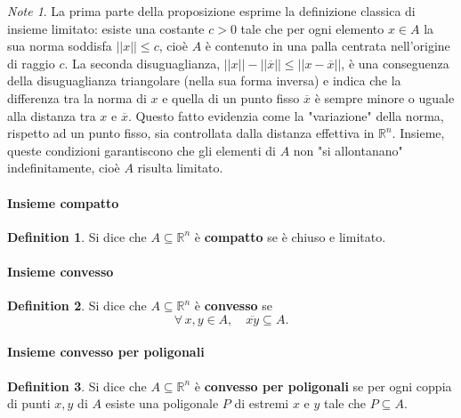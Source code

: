 \documentclass{article}
\theoremstyle{plain}
\theoremstyle{definition}
\newtheorem{defn}{Definition}[section]
\theoremstyle{remark}
\newtheorem{note}{Note}
\begin{document}
\vspace{10pt}

\begin{note}
    La prima parte della proposizione esprime la definizione classica di insieme limitato: esiste una costante $c>0$ tale che per ogni elemento $x\in A$ 
    la sua norma soddisfa $||x||\leq c$, cioè $A$ è contenuto in una palla centrata nell'origine di raggio $c$. La seconda disuguaglianza, 
    $||x||-|| \overline{x} ||\leq || x-\overline{x} ||$, è una conseguenza della disuguaglianza triangolare (nella sua forma inversa) e indica che la 
    differenza tra la norma di $x$ e quella di un punto fisso $\overline{x}$ è sempre minore o uguale alla distanza tra $x$ e $\overline{x}$. 
    Questo fatto evidenzia come la "variazione" della norma, rispetto ad un punto fisso, sia controllata dalla distanza effettiva in $\mathbb{R}^n$. 
    Insieme, queste condizioni garantiscono che gli elementi di $A$ non "si allontanano" indefinitamente, cioè $A$ risulta limitato.
\end{note}

\vspace{10pt}

\paragraph{Insieme compatto}
\begin{bxthm}
\begin{defn}
    Si dice che $A\subseteq\mathbb{R}^n$ è \textbf{compatto} se è chiuso e limitato.
\end{defn}
\end{bxthm}

\vspace{10pt}

\paragraph{Insieme convesso}
\begin{bxthm}
\begin{defn}
    Si dice che $A\subseteq\mathbb{R}^n$ è \textbf{convesso} se 
    \[\forall\, x,y\in A,\quad \overline{xy}\subseteq A.\]
\end{defn}
\end{bxthm}

\vspace{10pt}

\paragraph{Insieme convesso per poligonali}
\begin{bxthm}
\begin{defn}
    Si dice che $A\subseteq\mathbb{R}^n$ è \textbf{convesso per poligonali} se per ogni coppia di punti $x,y$ di $A$ esiste 
    una poligonale $P$ di estremi $x$ e $y$ tale che $P\subseteq A$.
\end{defn}
\end{bxthm}
\end{document}
